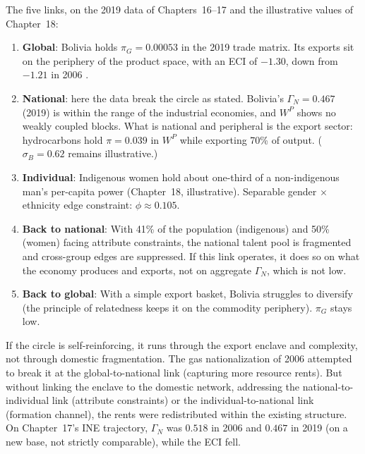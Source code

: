 \documentclass[../structural_economics_book.tex]{subfiles}
\begin{document}
\begin{example}\label{ch19:ex:vicious}
The five links, on the 2019 data of Chapters~16--17 and the illustrative values of Chapter~18:
\begin{enumerate}
\item \textbf{Global}: Bolivia holds $\pi_G = 0.00053$ in the 2019 trade matrix. Its exports sit on the periphery of the product space, with an ECI of $-1.30$, down from $-1.21$ in 2006 \citep{growthlab2026atlas}.
\item \textbf{National}: here the data break the circle as stated. Bolivia's $\Gamma_N = 0.467$ (2019) is within the range of the industrial economies, and $W^P$ shows no weakly coupled blocks. What is national and peripheral is the export sector: hydrocarbons hold $\pi = 0.039$ in $W^P$ while exporting 70\% of output. ($\sigma_B = 0.62$ remains illustrative.)
\item \textbf{Individual}: Indigenous women hold about one-third of a non-indigenous man's per-capita power (Chapter~18, illustrative). Separable gender $\times$ ethnicity edge constraint: $\phi \approx 0.105$.
\item \textbf{Back to national}: With 41\% of the population (indigenous) and 50\% (women) facing attribute constraints, the national talent pool is fragmented and cross-group edges are suppressed. If this link operates, it does so on what the economy produces and exports, not on aggregate $\Gamma_N$, which is not low.
\item \textbf{Back to global}: With a simple export basket, Bolivia struggles to diversify (the principle of relatedness keeps it on the commodity periphery). $\pi_G$ stays low.
\end{enumerate}

If the circle is self-reinforcing, it runs through the export enclave and complexity, not through domestic fragmentation. The gas nationalization of 2006 attempted to break it at the global-to-national link (capturing more resource rents). But without linking the enclave to the domestic network, addressing the national-to-individual link (attribute constraints) or the individual-to-national link (formation channel), the rents were redistributed within the existing structure. On Chapter~17's INE trajectory, $\Gamma_N$ was $0.518$ in 2006 and $0.467$ in 2019 (on a new base, not strictly comparable), while the ECI fell.
\end{example}


\end{document}

